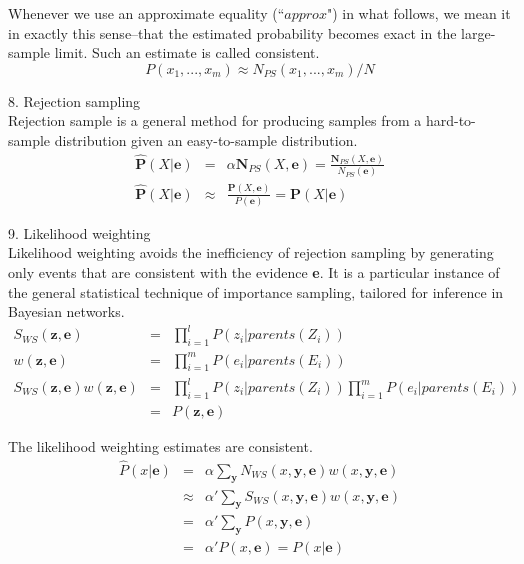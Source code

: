 \documentclass[12pt]{article}
\begin{document}
Whenever we use an approximate equality (``$approx$") in what follows, we mean it in exactly this sense--that the estimated probability becomes exact in the large-sample limit. Such an estimate is called consistent.
\begin{equation*}
  P(x_1,...,x_m) \approx N_{PS}(x_1,...,x_m)/N
\end{equation*}

8. Rejection sampling \\

Rejection sample is a general method for producing samples from a hard-to-sample distribution given an easy-to-sample distribution.
\begin{eqnarray*}
  \hat{\boldsymbol{P}}(X|\boldsymbol{e})
  &=& \alpha \boldsymbol{N}_{PS}(X, \boldsymbol{e})
  = \frac {\boldsymbol{N}_{PS}(X, \boldsymbol{e})}
          {N_{PS}(\boldsymbol{e})} \\
  \hat{\boldsymbol{P}}(X|\boldsymbol{e})
  &\approx& \frac {\boldsymbol{P}(X, \boldsymbol{e})}
                  {P(\boldsymbol{e})}
  = \boldsymbol{P}(X | \boldsymbol{e})
\end{eqnarray*}

9. Likelihood weighting \\

Likelihood weighting avoids the inefficiency of rejection sampling by generating only events that are consistent with the evidence {\bf e}. It is a particular instance of the general statistical technique of importance sampling, tailored for inference in Bayesian networks.
\begin{eqnarray*}
S_{WS}(\boldsymbol{z}, \boldsymbol{e})
&=& \prod^l_{i=1} P(z_i | parents(Z_i)) \\
w(\boldsymbol{z}, \boldsymbol{e})
&=& \prod^m_{i=1} P(e_i | parents(E_i)) \\
S_{WS}(\boldsymbol{z}, \boldsymbol{e}) w(\boldsymbol{z}, \boldsymbol{e})
&=& \prod^l_{i=1} P(z_i | parents(Z_i)) \prod^m_{i=1} P(e_i | parents(E_i)) \\
&=& P(\boldsymbol{z}, \boldsymbol{e})
\end{eqnarray*}

The likelihood weighting estimates are consistent.
\begin{eqnarray*}
\hat{P}(x | \boldsymbol{e})
&=& \alpha \sum_{\boldsymbol{y}} N_{WS}(x, \boldsymbol{y}, \boldsymbol{e})
    w(x, \boldsymbol{\boldsymbol{y}}, \boldsymbol{e}) \\
&\approx& \alpha' \sum_{\boldsymbol{y}} S_{WS}(x, \boldsymbol{y}, \boldsymbol{e})
          w(x, \boldsymbol{y}, \boldsymbol{e}) \\
&=& \alpha' \sum_{\boldsymbol{y}} P(x, \boldsymbol{y}, \boldsymbol{e}) \\
&=& \alpha' P(x, \boldsymbol{e}) = P(x | \boldsymbol{e})
\end{eqnarray*}
\end{document}
